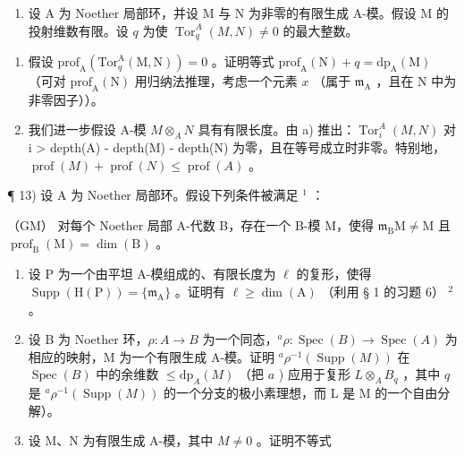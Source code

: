 \begin{enumerate}
\def\labelenumi{\arabic{enumi})}
\setcounter{enumi}{11}
\tightlist
\item
  设 A 为 Noether 局部环，并设 M 与 N 为非零的有限生成 \(\mathrm{A}\)-模。假设 M 的投射维数有限。设 \(q\) 为使 \(\operatorname{Tor}_q^A(M, N) \neq 0\) 的最大整数。
\end{enumerate}

\begin{enumerate}
\def\labelenumi{\alph{enumi})}
\item
  假设 \(\mathrm{prof}_{\mathrm{A}}(\mathrm{Tor}_{q}^{\mathrm{A}}(\mathrm{M},\mathrm{N})) = 0\) 。证明等式 \(\mathrm{prof}_{\mathrm{A}}(\mathrm{N}) + q = \mathrm{dp}_{\mathrm{A}}(\mathrm{M})\) （可对 \(\mathrm{prof}_{\mathrm{A}}(\mathrm{N})\) 用归纳法推理，考虑一个元素 \(x\) （属于 \(\mathfrak{m}_{\mathrm{A}}\) ，且在 N 中为非零因子））。
\item
  我们进一步假设 A-模 \(M \otimes_{A} N\) 具有有限长度。由 a) 推出：\(\operatorname{Tor}_{i}^{A}(M, N)\) 对 i \textgreater{} depth(A) - depth(M) - depth(N) 为零，且在等号成立时非零。特别地，\(\operatorname{prof}(M) + \operatorname{prof}(N) \leqslant \operatorname{prof}(A)\) 。
\end{enumerate}

¶ 13) 设 A 为 Noether 局部环。假设下列条件被满足 \(^{1}\) ：

（GM） 对每个 Noether 局部 A-代数 B，存在一个 B-模 M，使得 \(\mathfrak{m}_{\mathrm{B}}\mathrm{M}\neq\mathrm{M}\) 且 \(\operatorname{prof}_{\mathrm{B}}(\mathrm{M})=\dim(\mathrm{B})\) 。

\begin{enumerate}
\def\labelenumi{\alph{enumi})}
\item
  设 P 为一个由平坦 A-模组成的、有限长度为 \(\ell\) 的复形，使得 \(\operatorname{Supp}(\mathrm{H}(\mathrm{P})) = \{\mathfrak{m}_{\mathrm{A}}\}\) 。证明有 \(\ell \geqslant \dim(\mathrm{A})\) （利用 § 1 的习题 6） \(^2\) 。
\item
  设 B 为 Noether 环，\(\rho: A \to B\) 为一个同态，\(^a\rho: \operatorname{Spec}(B) \to \operatorname{Spec}(A)\) 为相应的映射，M 为一个有限生成 A-模。证明 \(^a\rho^{-1}(\operatorname{Supp}(M))\) 在 \(\operatorname{Spec}(B)\) 中的余维数 \(\leqslant \mathrm{dp}_A(M)\) （把 \(a\) ) 应用于复形 \(L \otimes_A B_q\) ，其中 \(q\) 是 \(^a\rho^{-1}(\operatorname{Supp}(M))\) 的一个分支的极小素理想，而 L 是 M 的一个自由分解）。
\item
  设 M、N 为有限生成 A-模，其中 \(M \neq 0\) 。证明不等式
\end{enumerate}


